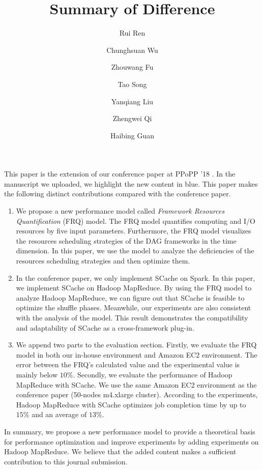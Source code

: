 \documentclass[12pt,reqno]{amsart}
\title{Summary of Difference}
\author{Rui Ren}
\author{Chunghsuan Wu}
\author{Zhouwang Fu}
\author{Tao Song}
\author{Yanqiang Liu}
\author{Zhengwei Qi}
\author{Haibing Guan}
\theoremstyle{plain}
\numberwithin{equation}{section}
\theoremstyle{plain}
\numberwithin{equation}{section}
\begin{document}
\maketitle



This paper is the extension of our conference paper at PPoPP '18 \cite{fu2018efficient}. 
In the manuscript we uploaded, we highlight the new content in blue.
This paper makes the following distinct contributions compared with the conference paper.

\begin{enumerate}
\item 
We propose a new performance model called \textit{Framework Resources Quantification} (FRQ) model.
The FRQ model quantifies computing and I/O resources by five input parameters. 
Furthermore, the FRQ model visualizes the resources scheduling strategies of the DAG frameworks in the time dimension. 
In this paper, we use the model to analyze the deficiencies of the resources scheduling strategies and then optimize them.
\item 
In the conference paper, we only implement SCache on Spark. 
In this paper, we implement SCache on Hadoop MapReduce. 
By using the FRQ model to analyze Hadoop MapReduce, we can figure out that SCache is feasible to optimize the shuffle phases. 
Meanwhile, our experiments are also consistent with the analysis of the model.
This result demonstrates the compatibility and adaptability of SCache as a cross-framework plug-in.
\item
We append two parts to the evaluation section. 
Firstly, we evaluate the FRQ model in both our in-house environment and Amazon EC2 environment. The error between the FRQ’s calculated value and the experimental value is mainly below $10\%$. 
Secondly, we evaluate the performance of Hadoop MapReduce with SCache. We use the same Amazon EC2 environment as the conference paper (50-nodes m4.xlarge cluster).
According to the experiments, Hadoop MapReduce with SCache optimizes job completion time by up to $15\%$ and an average of $13\%$.
\end{enumerate}

In summary, we propose a new performance model to provide a theoretical basis for performance optimization and improve experiments by adding experiments on Hadoop MapReduce. 
We believe that the added content makes a sufficient contribution to this journal submission.



\end{document}

